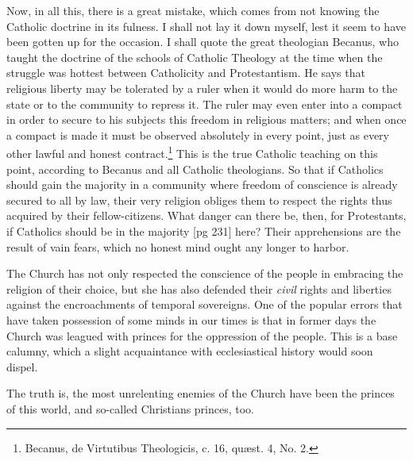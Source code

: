 Now, in all this, there is a great mistake, which
comes from not knowing the Catholic doctrine in
its fulness. I shall not lay it down myself, lest
it seem to have been gotten up for the occasion.
I shall quote the great theologian Becanus, who
taught the doctrine of the schools of Catholic
Theology at the time when the struggle was hottest
between Catholicity and Protestantism. He
says that religious liberty may be tolerated by a
ruler when it would do more harm to the state
or to the community to repress it. The ruler
may even enter into a compact in order to secure
to his subjects this freedom in religious matters;
and when once a compact is made it must be
observed absolutely in every point, just as every
other lawful and honest contract.\footnote{Becanus,
de Virtutibus Theologicis, c. 16, quæst. 4, No. 2.} This is the
true Catholic teaching on this point, according
to Becanus and all Catholic theologians. So that
if Catholics should gain the majority in a community
where freedom of conscience is already
secured to all by law, their very religion obliges
them to respect the rights thus acquired by their
fellow-citizens. What danger can there be, then,
for Protestants, if Catholics should be in the majority
[pg 231]
here? Their apprehensions are the result
of vain fears, which no honest mind ought any
longer to harbor.

The Church has not only respected the conscience
of the people in embracing the religion
of their choice, but she has also defended their
\emph{civil} rights and liberties against the encroachments
of temporal sovereigns. One of the popular
errors that have taken possession of some
minds in our times is that in former days the
Church was leagued with princes for the oppression
of the people. This is a base calumny, which
a slight acquaintance with ecclesiastical history
would soon dispel.

The truth is, the most unrelenting enemies of
the Church have been the princes of this world,
and so-called Christians princes, too.

